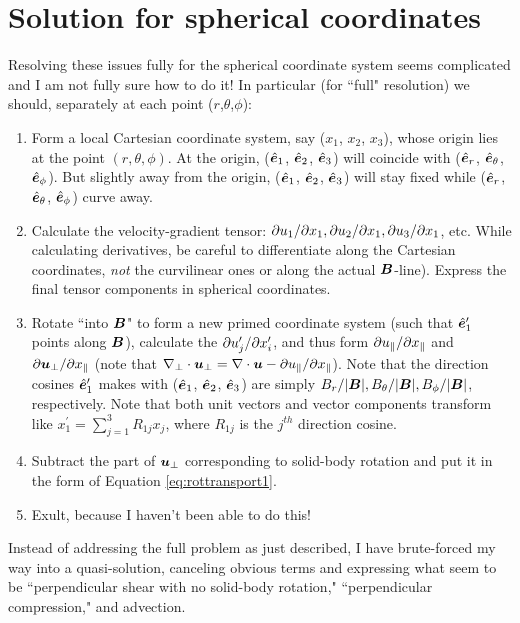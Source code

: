 \documentclass[12pt]{article}
\newcommand{\xpar}{x_\parallel}
\newcommand{\upar}{u_\parallel}
\newcommand{\uperp}{\vecu_\perp}
\begin{document}
\section{Solution for spherical coordinates}
Resolving these issues fully for the spherical coordinate system seems complicated and I am not fully sure how to do it! In particular (for ``full" resolution) we should, separately at each point ($r$,$\theta$,$\phi$):
\begin{enumerate}
	\item Form a local Cartesian coordinate system, say ($x_1$, $x_2$, $x_3$), whose origin lies at the point $(r,\theta,\phi)$. At the origin, ($\hat{\bm{e}}_1$, $\hat{\bm{e}}_2$, $\hat{\bm{e}}_3$) will coincide with ($\hat{\bm{e}}_r$, $\hat{\bm{e}}_\theta$, $\hat{\bm{e}}_\phi$). But slightly away from the origin, ($\hat{\bm{e}}_1$, $\hat{\bm{e}}_2$, $\hat{\bm{e}}_3$) will stay fixed while ($\hat{\bm{e}}_r$, $\hat{\bm{e}}_\theta$, $\hat{\bm{e}}_\phi$) curve away. 
	\item Calculate the velocity-gradient tensor: $\partial u_1/\partial x_1,\partial u_2/\partial x_1, \partial u_3/\partial x_1$, etc. While calculating derivatives, be careful to differentiate along the Cartesian coordinates, \textit{not} the curvilinear ones or along the actual $\bm{B}$-line). Express the final tensor components in spherical coordinates.
	\item Rotate ``into $\bm{B}$" to form a new primed coordinate system (such that $\hat{\bm{e}}_1^\prime$ points along $\bm{B}$), calculate the $\partial u_j^\prime/\partial x_i^\prime$, and thus form $\pderivline{\upar}{\xpar}$ and $\pderivline{\uperp}{\xpar}$ (note that $\nabla_\perp\cdot\uperp=\Div\vecu- \pderivline{\upar}{\xpar}$). Note that the direction cosines $\hat{\bm{e}}_1^\prime$ makes with ($\hat{\bm{e}}_1$, $\hat{\bm{e}}_2$, $\hat{\bm{e}}_3$) are simply $B_r/|\bm{B}|, B_\theta/|\bm{B}|, B_\phi/|\bm{B}|$, respectively. Note that both unit vectors and vector components transform like $x_1^\prime=\sum_{j=1}^3R_{1j}x_j$, where $R_{1j}$ is the $j^{th}$ direction cosine.  
	\item Subtract the part of $\uperp$ corresponding to solid-body rotation and put it in the form of Equation \eqref{eq:rottransport1}. 
	\item Exult, because I haven't been able to do this!
\end{enumerate}
Instead of addressing the full problem as just described, I have brute-forced my way into a quasi-solution, canceling obvious terms and expressing what seem to be ``perpendicular shear with no solid-body rotation," ``perpendicular compression," and advection. 
\end{document}
